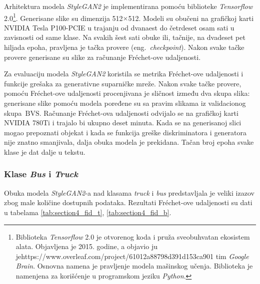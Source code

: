 \documentclass[12pt,oneside]{memoir}
\newcommand{\bvs}{\ensuremath{\,\textrm{BVS}}}
\begin{document}
Arhitektura modela \textit{StyleGAN2} je implementirana pomoću biblioteke \textit{Tensorflow} 2.0\footnote{Biblioteka \textit{Tensorflow} 2.0 je otvorenog koda i pruža sveobuhvatan ekosistem alata. Objavljena je 2015. godine, a objavio ju jehttps://www.overleaf.com/project/61012a88798d391d153ca901 tim \textit{Google Brain}. Osnovna namena je pravljenje modela mašinskog učenja. Biblioteka je namenjena za korišćenje u programskom jeziku \textit{Python}.}.
Generisane slike su dimenzija 512\(\times\)512. Modeli su obučeni na grafičkoj karti NVIDIA Tesla P100-PCIE u trajanju od dvanaest do četrdeset osam sati u zavisnosti od same klase. Na svakih šest sati obuke ili, tačnije, na dvadeset pet hiljada epoha, pravljena je tačka provere (eng.~\textit{checkpoint}). Nakon svake tačke provere generisane su slike za računanje Fréchet-ove udaljenosti.

Za evaluaciju modela \textit{StyleGAN2} koristila se metrika Fréchet-ove udaljenosti i funkcije grešaka za generativne suparničke mreže. Nakon svake tačke provere, pomoću Fréchet-ove udaljenosti procenjivana je sličnost između dva skupa slika: generisane slike pomoću modela poređene su sa pravim slikama iz validacionog skupa \bvs{}. Računanje Fréchet-ova udaljenosti odvijalo se na grafičkoj karti NVIDIA 780Ti i trajalo bi ukupno deset minuta. Kada se na generisanoj slici mogao prepoznati objekat i kada se funkcija greške diskriminatora i generatora nije znatno smanjivala, dalja obuka modela je prekidana. Tačan broj epoha svake klase je dat dalje u tekstu.



\subsubsection{Klase \textit{Bus} i \textit{Truck}}

Obuka modela \textit{StyleGAN2}-a nad klasama \textit{truck} i \textit{bus} predstavljala je veliki izazov zbog male količine dostupnih podataka. 
Rezultati Fréchet-ove udaljenosti su dati u tabelama \ref{tab:section4_fid_t}, \ref{tab:section4_fid_b}.
\end{document}
